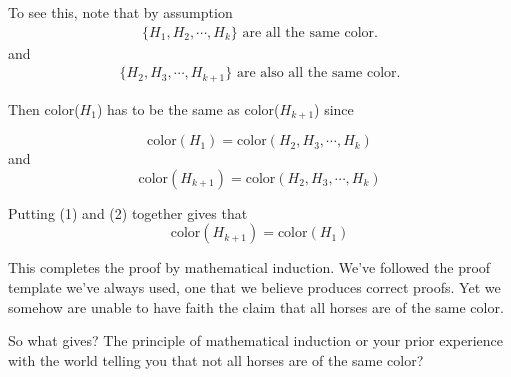 \documentclass{tufte-handout}
\begin{document}
\bigskip
To see this, note that by assumption
 \begin{equation*}
 \begin{aligned}
\{ H_1, H_2, \cdots, H_{k} \}  \text{ are all the same color.} 
\end{aligned}
\end{equation*}
and
\begin{equation*}
 \begin{aligned}
\{ H_2, H_3, \cdots, H_{k+1} \}  \text{ are also all the same color.}
\end{aligned}
\end{equation*}

\bigskip
Then color($H_1$) has to be the same as color($H_{k+1}$) since  

\begin{equation}
\text{color}(H_1) = \text{color}( H_2, H_3, \cdots, H_k)                                           
\end{equation}
and
\begin{equation}
\text{color}(H_{k+1}) = \text{color}( H_2, H_3, \cdots, H_k)                                           
\end{equation}

\bigskip
Putting (1) and (2) together gives that 
\begin{equation*}
\text{color}(H_{k+1}) = \text{color}(H_1)                                       
\end{equation*}

This completes the proof by mathematical induction. We've followed the proof template we've always used, one that we believe produces correct proofs.  Yet we somehow are unable to have faith the claim that all horses are of the same color. 

 \bigskip
 So what gives? The principle of mathematical induction or your prior experience with the world telling you that not all horses are of the same color? 
\end{document}
